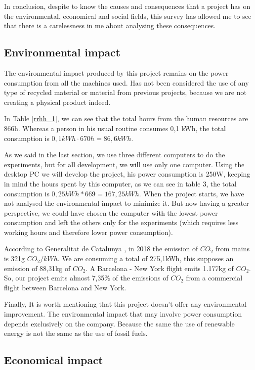 \documentclass[titlepage,12pt]{report}
\begin{document}
In conclusion, despite to know the causes and consequences that a project has on the environmental, economical and social fields, this survey has allowed me to see that there is a carelessness in me about analysing these consequences.

\subsection{Environmental impact}

The environmental impact produced by this project remains on the power consumption from all the machines used. Has not been considered the use of any type of recycled material or material from previous projects, because we are not creating a physical product indeed.

In Table \ref{rrhh_1}, we can see that the total hours from the human resources are 866h. Whereas a person in his usual routine consumes 0,1 kWh, the total consumption is $0,1kWh \cdot 670h = 86,6kWh$.

As we said in the last section, we use three different computers to do the experiments, but for all development, we will use only one computer. Using the desktop PC we will develop the project, his power consumption is 250W, keeping in mind the hours spent by this computer, as we can see in table 3, the total consumption is $0,25 kWh * 669 = 167,25kWh$. When the project starts, we have not analysed the environmental impact to minimize it. But now having a greater perspective, we could have chosen the computer with the lowest power consumption and left the others only for the experiments (which requires less working hours and therefore lower power consumption).

According to Generalitat de Catalunya \citep{gene}, in 2018 the emission of $CO_{2}$ from mains is 321g $CO_{2}/kWh$. We are consuming a total of 275,1kWh, this supposes an emission of 88,31kg of $CO_{2}$. A Barcelona - New York flight emits 1.177kg of $CO_{2}$. So, our project emits almost 7,35\% of the emissions of $CO_{2}$ from a commercial flight between Barcelona and New York.

Finally, It is worth mentioning that this project doesn't offer any environmental improvement. The environmental impact that may involve power consumption depends exclusively on the company. Because the same the use of renewable energy is not the same as the use of fossil fuels.

\subsection{Economical impact}
\end{document}
